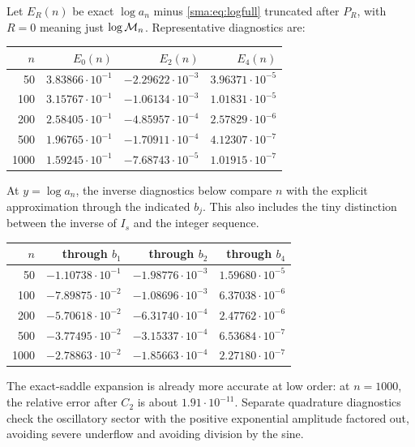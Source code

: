 \documentclass[11pt,letterpaper]{article}
\numberwithin{equation}{section}
\begin{document}
Let $E_R(n)$ be exact $\log a_n$ minus \eqref{sma:eq:logfull} truncated after $P_R$, with $R=0$ meaning just $\log\mathcal M_n$. Representative diagnostics are:
\begin{center}
\begin{tabular}{r r r r}
\toprule
$n$ & $E_0(n)$ & $E_2(n)$ & $E_4(n)$\\\midrule
50 & $3.83866\cdot10^{-1}$ & $-2.29622\cdot10^{-3}$ & $3.96371\cdot10^{-5}$\\
100 & $3.15767\cdot10^{-1}$ & $-1.06134\cdot10^{-3}$ & $1.01831\cdot10^{-5}$\\
200 & $2.58405\cdot10^{-1}$ & $-4.85957\cdot10^{-4}$ & $2.57829\cdot10^{-6}$\\
500 & $1.96765\cdot10^{-1}$ & $-1.70911\cdot10^{-4}$ & $4.12307\cdot10^{-7}$\\
1000 & $1.59245\cdot10^{-1}$ & $-7.68743\cdot10^{-5}$ & $1.01915\cdot10^{-7}$\\\bottomrule
\end{tabular}
\end{center}
At $y=\log a_n$, the inverse diagnostics below compare $n$ with the explicit approximation through the indicated $b_j$. This also includes the tiny distinction between the inverse of $I_s$ and the integer sequence.
\begin{center}
\begin{tabular}{r r r r}
\toprule
$n$ & through $b_1$ & through $b_2$ & through $b_4$\\\midrule
50 & $-1.10738\cdot10^{-1}$ & $-1.98776\cdot10^{-3}$ & $1.59680\cdot10^{-5}$\\
100 & $-7.89875\cdot10^{-2}$ & $-1.08696\cdot10^{-3}$ & $6.37038\cdot10^{-6}$\\
200 & $-5.70618\cdot10^{-2}$ & $-6.31740\cdot10^{-4}$ & $2.47762\cdot10^{-6}$\\
500 & $-3.77495\cdot10^{-2}$ & $-3.15337\cdot10^{-4}$ & $6.53684\cdot10^{-7}$\\
1000 & $-2.78863\cdot10^{-2}$ & $-1.85663\cdot10^{-4}$ & $2.27180\cdot10^{-7}$\\\bottomrule
\end{tabular}
\end{center}
The exact-saddle expansion is already more accurate at low order: at $n=1000$, the relative error after $C_2$ is about $1.91\cdot10^{-11}$. Separate quadrature diagnostics check the oscillatory sector with the positive exponential amplitude factored out, avoiding severe underflow and avoiding division by the sine.
\end{document}
